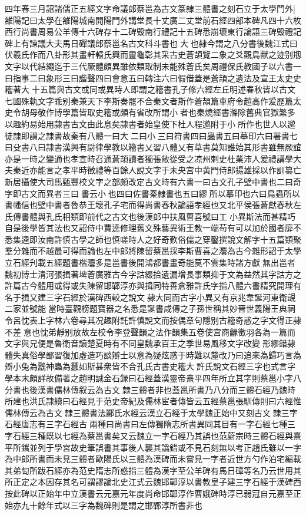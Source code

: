 四年春三月詔諸儒正五經文字命議郎蔡邕為古文篆隸三體書之刻石立于太學門外|{
	雒陽記曰太學在雒陽城南開陽門外講堂長十丈廣二丈堂前石經四部本碑凡四十六枚西行尚書周易公羊傳十六碑存十二碑毁南行禮記十五碑悉崩壞東行論語三碑毁禮記碑上有諫議大夫馬日磾議郎蔡邕名古文科斗書也大也隸今謂之八分書後魏江式曰伏羲氏作而八卦形其畫軒轅氏興而靈龜彰其采古史蒼頡覽二象之爻觀鳥獸之迹别剏文字以代結繩迄于三代厥體頗異雖依類取制未能殊蒼氏矣周禮保氏教國子以六書一曰指事二曰象形三曰諧聲四曰會意五曰轉注六曰假借蓋是蒼頡之遺法及宣王太史史籕著大十五篇與古文或同或異時人即謂之籕書孔子修六經左丘明述春秋皆以古文七國殊軌文字乖别秦兼天下李斯奏罷不合秦文者斯作蒼頡篇車府令趙高作爰歷篇太史令胡母敬作博學篇皆取史籕或頗有省改所謂小者也秦燒經書滌除舊典官獄繁多以趣約易始用隷書古文由此息矣隷書者始皇使下杜人程邈附于小所作也世人以邈徒隷即謂之隷書故秦有八體一曰大二曰小三曰符書四曰蟲書五曰摹印六曰署書七曰殳書八曰隷書漢興有尉律學教以籕書乂習八體乂有草書莫知誰始其形書雖無厥誼亦是一時之變通也孝宣時召通蒼頡讀者獨張敞從受之凉州刺史杜業沛人爰禮講學大夫秦近亦能言之孝平時徵禮等百餘人說文字于未央宫中黄門侍郎揚雄採以作訓纂亡新居攝使大司馬甄豐校文字之部頗改定古文時有六書一曰古文孔子壁中書也二曰奇字即古文而異者三曰書云小也四曰佐書秦隷書也五曰繆所以摹印也六曰鳥蟲所以書幡信也壁中書者魯恭王壞孔子宅而得尚書春秋論語孝經也又北平侯張蒼獻春秋左氏傳書體與孔氏相類即前代之古文也後漢郎中扶風曹喜號曰工小異斯法而甚精巧自是後學皆其法也又詔侍中賈逵修理舊文殊藝異術王教一端苟有可以加於國者靡不悉集逵即汝南許慎古學之師也慎嗟時人之好奇歎俗儒之穿鑿撰說文解字十五篇類聚羣分雜而不越最可得而論也左中郎將陳留蔡邕採李斯曹喜之灋為古今雜形詔于太學立石經刋載五經題書楷灋多是邕書後開鴻都書畫奇能莫不雲集時諸方獻無出邕者魏初博士清河張揖著埤蒼廣雅古今字詁綴拾遺漏增長事類抑于文為益然其字詁方之許篇古今體用或得或失陳留邯鄲淳亦與揖同特善倉雅許氏字指八體六書精究開理有名于揖又建三字石經於漢碑西較之說文隷大同而古字小異又有京兆韋誕河東衛覬二家並號能當時臺觀榜題寶器之名悉是誕書咸傳之子孫世稱其妙晉世義陽王典祠令呂忱表上字林六卷尋其况趣附託許慎說文而按偶章句隱别古籕奇惑之字文得正隷不差意也忱弟靜别放故左校令李登聲韻之法作韻集五卷使宫商龣徵羽各為一篇而文字與兄便是魯衛音讀楚夏時有不同皇魏承百王之季世易風移文字改變形繆錯隷體失真俗學鄙習復加虛造巧談辯士以意為疑炫惑于時難以釐改乃曰追來為歸巧言為辯小兔為䨲神蟲為蠶如斯甚衆皆不合孔氏古書史籕大許氏說文石經三字也式言字學本末頗詳故備著之趙明誠金石録曰石經蓋漢靈帝熹平四年所立其字則蔡邕小字八分書也後漢書儒林傳叙云為古文隷三體者非也蓋邕所書乃八分而三體石經乃魏時所建也洪氏隷續曰石經見于范史帝紀及儒林宦者傳皆云五經蔡邕張馴傳則曰六經惟儒林傳云為古文隸三體書法酈氏水經云漢立石經于太學魏正始中又刻古文隸三字石經唐志有三字石經古兩種曰尚書曰左傳獨隋志所書異同其目有一字石經七種三字石經三種既以七經為蔡邕書矣又云魏立一字石經乃其誤也范蔚宗時三體石經與熹平所䥴並列于學宮故史筆誤書其事後人襲其譌錯或不見石刻無以考正趙氏雖以一字為中郎所書而未見三體者歐陽氏以三體為漢碑而未嘗見一字者近世方勺作泊宅編載其弟匋所跋石經亦為范史隋志所惑指三體為漢字至公羊碑有馬日磾等名乃云世用其所正定之本因存其名可謂謬論北史江式云魏邯鄲淳以書教皇子建三字石經于漢碑西按此碑以正始年中立漢書云元嘉元年度尚命邯鄲淳作曹娥碑時淳已弱冠自元嘉至正始亦九十餘年式以三字為魏碑則是謂之邯鄲淳所書非也}
